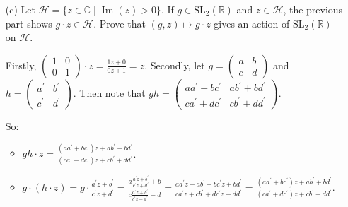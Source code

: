 \documentclass{book}
\newcommand{\exOne}{%
   \color{Purple}%
   \fontsize{13}{15}\selectfont%
}
\newenvironment{myIndent}{%
   \begin{adjustwidth}{2.5em}{0em}%
}{%
   \end{adjustwidth}%
}
\DeclareMathOperator{\ima}{Im}
\newcommand{\retTwo}{\hfill\bigbreak}
\begin{document}
\begin{enumerate}
\begin{enumerate}
\begin{myIndent}
			Also note that because $y > 0$ and $|cz + d|^2 > 0$, we know that\\ $\ima(\frac{az + b}{cz + d}) = \frac{y}{|cz + d|^2} > 0$.
			\retTwo
		\end{myIndent}
		\item[(c)] Let $\mathcal{H} = \{z \in \mathbb{C} \mid \ima(z) > 0\}$. If $g \in \mathrm{SL}_2(\mathbb{R})$ and $z \in \mathcal{H}$, the previous part shows $g \cdot z \in \mathcal{H}$. Prove that $(g, z) \mapsto g \cdot z$ gives an action of $\mathrm{SL}_2(\mathbb{R})$ on $\mathcal{H}$.  
		\begin{myIndent}\exOne
			Firstly, $\left(
			\begin{smallmatrix}
				1 & 0 \\ 0 & 1
			\end{smallmatrix}\right) \cdot z = \frac{1z + 0}{0z + 1} = z$.
			\newpage
			Secondly, let $g = \left(
			\begin{smallmatrix}
				a & b \\ c & d
			\end{smallmatrix}\right)$ and $h = \left(
				\begin{smallmatrix}
					a^\prime & b^\prime \\ c^\prime & d^\prime
			\end{smallmatrix}\right)$. Then note that $gh = \left(
				\begin{smallmatrix}
					aa^\prime + bc^\prime & ab^\prime + bd^\prime \\ ca^\prime + dc^\prime & cb^\prime + dd^\prime
			\end{smallmatrix}\right)$.\retTwo

			So:
			\begin{itemize}
				\item $gh \cdot z = \frac{(aa^\prime + bc^\prime)z + ab^\prime + bd^\prime }{(ca^\prime + dc^\prime)z + cb^\prime + dd^\prime}$.
				
				\item $g \cdot (h \cdot z) = g \cdot \frac{a^\prime z + b^\prime}{c^\prime z + d^\prime} = \frac{a\frac{a^\prime z + b^\prime}{c^\prime z + d^\prime} + b}{c\frac{a^\prime z + b^\prime}{c^\prime z + d^\prime} + d} = \frac{aa^\prime z + ab^\prime + bc^\prime z + bd^\prime}{ca^\prime z + cb^\prime + dc^\prime z + dd^\prime} = \frac{(aa^\prime + bc^\prime)z + ab^\prime + bd^\prime }{(ca^\prime + dc^\prime)z + cb^\prime + dd^\prime}$.
			\end{itemize}
			\retTwo
		\end{myIndent}
	\end{enumerate}


\end{enumerate}
\end{document}
